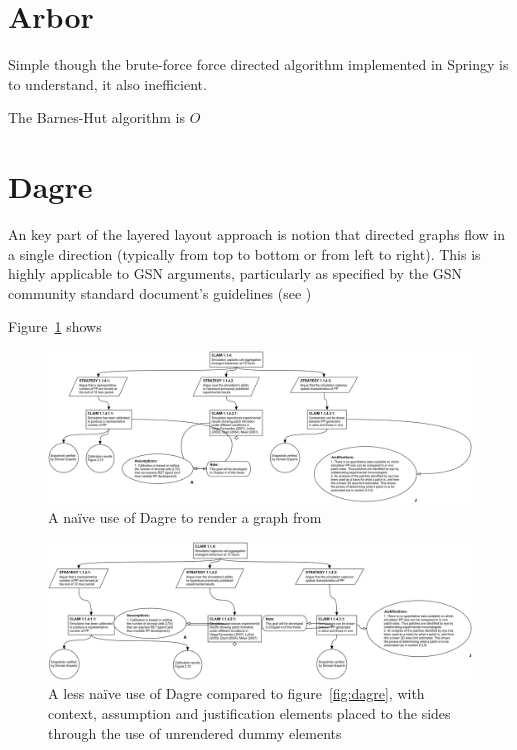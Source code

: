 \section{Arbor}

Simple though the brute-force force directed algorithm implemented in Springy is to understand, it also inefficient.

The Barnes-Hut algorithm is $O$



\section{Dagre}

An key part of the layered layout approach is notion that directed graphs flow in a single direction (typically from top to bottom or from left to right). This is highly applicable to GSN arguments, particularly as specified by the GSN community standard document's guidelines \cite{gsnspec} (see )

Figure~\ref{fig:dagre1} shows

\begin{figure}
  \centering
  \includegraphics[width=\textwidth]{graphics/results/dagre.png}
  \caption{A na\"ive use of Dagre to render a graph from \cite{aldenthesis}}
  \label{fig:dagre1}
\end{figure}



\begin{figure}
  \centering
  \includegraphics[width=\textwidth]{graphics/results/dagre-enhanced.png}
  \caption{A less na\"ive use of Dagre compared to figure~\ref{fig:dagre}, with context, assumption and justification elements placed to the sides through the use of unrendered dummy elements}
  \label{fig:dagre2}
\end{figure}



